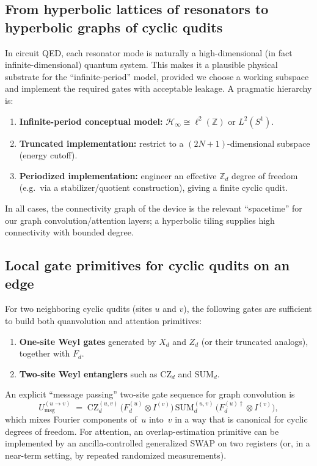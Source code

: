 \documentclass[11pt,oneside]{amsbook}
\numberwithin{equation}{section}
\theoremstyle{plain}
\theoremstyle{definition}
\theoremstyle{remark}
\begin{document}
\subsection{From hyperbolic lattices of resonators to hyperbolic graphs of cyclic qudits}
In circuit QED, each resonator mode is naturally a high-dimensional (in fact infinite-dimensional)
quantum system. This makes it a plausible physical substrate for the ``infinite-period'' model,
provided we choose a working subspace and implement the required gates with acceptable leakage.
A pragmatic hierarchy is:
\begin{enumerate}
\item \textbf{Infinite-period conceptual model:} $\mathcal{H}_\infty\cong \ell^2(\mathbb{Z})$ or $L^2(S^1)$.
\item \textbf{Truncated implementation:} restrict to a $(2N+1)$-dimensional subspace (energy cutoff).
\item \textbf{Periodized implementation:} engineer an effective $\mathbb{Z}_d$ degree of freedom
(e.g.\ via a stabilizer/quotient construction), giving a finite cyclic qudit.
\end{enumerate}
In all cases, the connectivity graph of the device is the relevant ``spacetime'' for our graph
convolution/attention layers; a hyperbolic tiling supplies high connectivity with bounded degree.

\subsection{Local gate primitives for cyclic qudits on an edge}
For two neighboring cyclic qudits (sites $u$ and $v$), the following gates are sufficient to build
both quanvolution and attention primitives:
\begin{enumerate}
\item \textbf{One-site Weyl gates} generated by $X_d$ and $Z_d$ (or their truncated analogs),
together with $F_d$.
\item \textbf{Two-site Weyl entanglers} such as $\mathrm{CZ}_d$ and $\mathrm{SUM}_d$.
\end{enumerate}
An explicit ``message passing'' two-site gate sequence for graph convolution is
\begin{equation}
  U_{\mathrm{msg}}^{(u\to v)}
  \;=\;
  \mathrm{CZ}_d^{(u,v)}\,
  \bigl(F_d^{(u)}\otimes I^{(v)}\bigr)\,
  \mathrm{SUM}_d^{(u,v)}\,
  \bigl(F_d^{(u)\dagger}\otimes I^{(v)}\bigr),
  \label{eq:message_passing_gate}
\end{equation}
which mixes Fourier components of~$u$ into~$v$ in a way that is canonical for cyclic degrees of freedom.
For attention, an overlap-estimation primitive can be implemented by an ancilla-controlled generalized
SWAP on two registers (or, in a near-term setting, by repeated randomized measurements).
\end{document}
